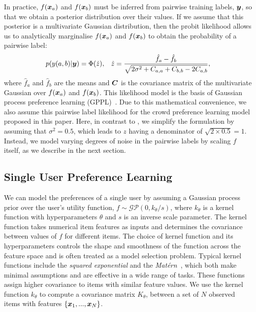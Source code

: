 In practice, $f(\boldsymbol x_a)$ and $f(\boldsymbol x_b)$ must be inferred from
pairwise training labels, $\boldsymbol y$,
so that we obtain a posterior distribution over their values.
If we assume that this posterior is a multivariate Gaussian distribution,
then the probit likelihood allows us to analytically marginalise 
$f(\boldsymbol x_a)$ and $f(\boldsymbol x_b)$
to obtain the probability of a pairwise label:
\begin{align}
p(y(a,b)| \boldsymbol y) 
= \Phi(\hat{z}),& & \hat{z} = \frac{\hat{f}_a - \hat{f}_b}{\sqrt{2\sigma^2 + C_{a,a} + C_{b,b} 
- 2C_{a,b}} }, \label{eq:predict_z}
\end{align}
where $\hat{f}_a$ and $\hat{f}_b$ are the means and
$\boldsymbol C$ is the covariance matrix of the multivariate Gaussian over
$f(\boldsymbol x_a)$ and $f(\boldsymbol x_b)$.
This likelihood model is the basis of Gaussian process preference learning (GPPL)~\citep{chu2005preference}. 
Due to this mathematical convenience,
we also assume this pairwise label likelihood for the crowd
preference learning model proposed in this paper.
Here, in contrast to \citet{chu2005preference},
we simplify the formulation by assuming that $\sigma^2 = 0.5$,
which leads to $z$ having a denominator of $\sqrt{2 \times 0.5}=1$.
Instead, we model varying degrees of noise in the pairwise labels
by scaling $f$ itself, as we describe in the next section.


\subsection{Single User Preference Learning}
We can model the preferences of a single user by assuming
a Gaussian process prior over the user's utility function, 
$f \sim \mathcal{GP}(0, k_{\theta}/s)$, where $k_{\theta}$ is a kernel function with hyperparameters $\theta$
and $s$ is an inverse scale parameter.
The kernel function takes numerical item features as inputs and determines the covariance between values of $f$ for different items. 
The choice of kernel function and its hyperparameters controls the shape and smoothness of the function 
across the feature space and is often treated as a model selection problem.
Typical kernel functions include the \emph{squared exponential} 
and the \emph{Mat\'ern}~\citep{rasmussen_gaussian_2006},
which both make minimal assumptions and are effective in a wide range of tasks. 
These functions assign higher covariance to items with similar feature values.
We use the kernel function $k_{\theta}$ to compute a covariance matrix $K_{\theta}$,
between a set of $N$ observed items with features $\{ \boldsymbol x_1, ..., \boldsymbol x_N \}$.

